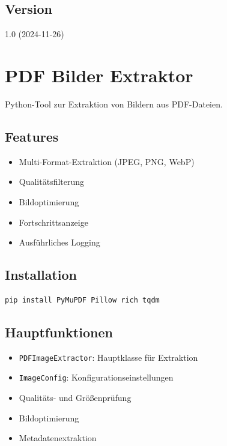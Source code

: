 \documentclass{vorlage-design-main}
\begin{document}
\subsection{Version}\label{version-2}

1.0 (2024-11-26)

\section{PDF Bilder Extraktor}\label{pdf-bilder-extraktor}

Python-Tool zur Extraktion von Bildern aus PDF-Dateien.

\subsection{Features}\label{features-3}

\begin{itemize}

\item
  Multi-Format-Extraktion (JPEG, PNG, WebP)
\item
  Qualitätsfilterung
\item
  Bildoptimierung
\item
  Fortschrittsanzeige
\item
  Ausführliches Logging
\end{itemize}

\subsection{Installation}\label{installation-2}

\begin{lstlisting}[language=bash]
pip install PyMuPDF Pillow rich tqdm
\end{lstlisting}

\subsection{Hauptfunktionen}\label{hauptfunktionen-1}

\begin{itemize}

\item
  \verb|PDFImageExtractor|: Hauptklasse für
  Extraktion
\item
  \verb|ImageConfig|: Konfigurationseinstellungen
\item
  Qualitäts- und Größenprüfung
\item
  Bildoptimierung
\item
  Metadatenextraktion
\end{itemize}
\end{document}
